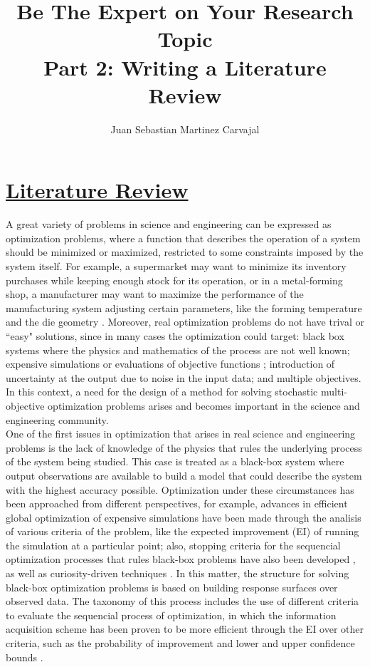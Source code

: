 \documentclass{journal}
\title{\textbf{Be The Expert on Your Research Topic}\\Part 2: Writing a Literature Review}
\author{Juan Sebastian Martinez Carvajal}
\date{}
\begin{document}
\maketitle
\hrulefill

\section{\underline{Literature Review}}

A great variety of problems in science and engineering can be expressed as optimization problems, where a function that describes the operation of a system should be minimized or maximized, restricted to some constraints imposed by the system itself. For example, a supermarket may want to minimize its inventory purchases while keeping enough stock for its operation, or in a metal-forming shop, a manufacturer may want to maximize the performance of the manufacturing system adjusting certain parameters, like the forming temperature and the die geometry \cite{Huang2006}. Moreover, real optimization problems do not have trival or ``easy" solutions, since in many cases the optimization could target: black box systems where the physics and mathematics of the process are not well known; expensive simulations or evaluations of objective functions \cite{Jones1998}; introduction of uncertainty at the output due to noise in the input data; and multiple objectives. In this context, a need for the design of a method for solving stochastic multi-objective optimization problems arises and becomes important in the science and engineering community.\\

One of the first issues in optimization that arises in real science and engineering problems is the lack of knowledge of the physics that rules the underlying process of the system being studied. This case is treated as a black-box system where output observations are available to build a model that could describe the system with the highest accuracy possible. Optimization under these circumstances has been approached from different perspectives, for example, advances in efficient global optimization of expensive simulations have been made through the analisis of various criteria of the problem, like the expected improvement (EI) of running the simulation at a particular point; also, stopping criteria for the sequencial optimization processes that rules black-box problems have also been developed \cite{Jones1998}, as well as curiosity-driven techniques \cite{Schaul2011}. In this matter, the structure for solving black-box optimization problems is based on building response surfaces over observed data. The taxonomy of this process includes the use of different criteria to evaluate the sequencial process of optimization, in which the information acquisition scheme has been proven to be more efficient through the EI over other criteria, such as the probability of improvement and lower and upper confidence bounds \cite{Jones2001}.\\
\end{document}
